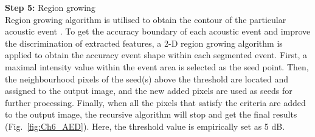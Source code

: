 \noindent \textbf{Step 5:} Region growing
\\
Region growing algorithm is utilised to obtain the contour of the particular acoustic event \cite{mallawaarachchi2008spectrogram}. To get the accuracy boundary of each acoustic event and improve the discrimination of extracted features, a 2-D region growing algorithm is applied to obtain the accuracy event shape within each segmented event. First, a maximal intensity value within the event area is selected as the seed point. Then, the neighbourhood pixels of the seed(s) above the threshold are located and assigned to the output image, and the new added pixels are used as seeds for further processing. Finally, when all the pixels that satisfy the criteria are added to the output image, the recursive algorithm will stop and get the final results (Fig.~\ref{fig:Ch6_AED}). Here, the threshold value is empirically set as 5 dB.

